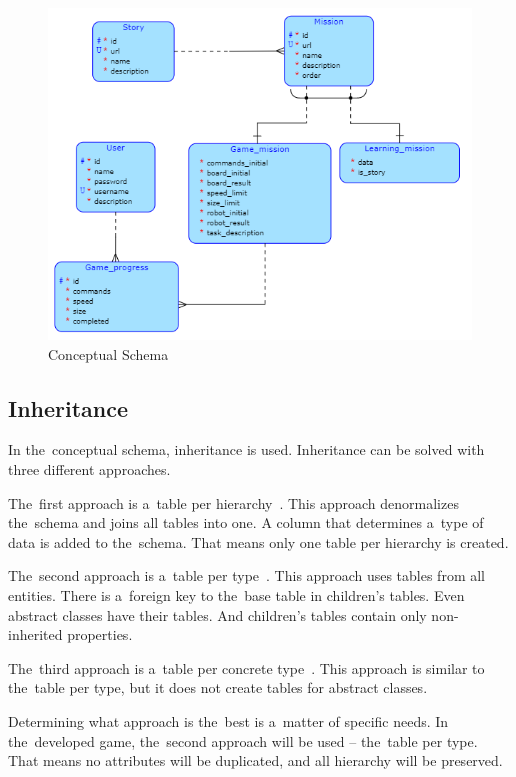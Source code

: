 \begin{figure}
    \centering
    \includegraphics[width=1\linewidth]{assets/design/conceptualdiagram.png}
    \caption{Conceptual Schema}
    \label{fig:design:conceptualschema}
\end{figure}

\subsection{Inheritance}

In the~conceptual schema, inheritance is used.
Inheritance can be solved with three different approaches.

The~first approach is a~table per hierarchy~\cite{a2010_enterprise}.
This approach denormalizes the~schema and joins all tables into one.
A column that determines a~type of data is added to the~schema.
That means only one table per hierarchy is created.

The~second approach is a~table per type~\cite{a2010_enterprise}.
This approach uses tables from all entities.
There is a~foreign key to the~base table in children's tables.
Even abstract classes have their tables.
And children's tables contain only non-inherited properties.

The~third approach is a~table per concrete type~\cite{a2010_enterprise}.
This approach is similar to the~table per type, but it does not create tables for abstract classes.

Determining what approach is the~best is a~matter of specific needs.
In the~developed game, the~second approach will be used -- the~table per type.
That means no attributes will be duplicated, and all hierarchy will be preserved.
